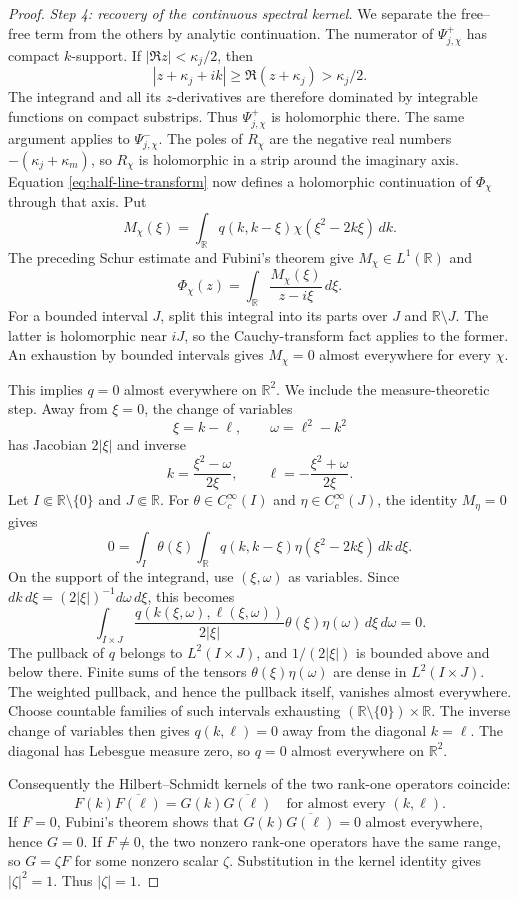 \documentclass[11pt]{amsart}
\numberwithin{equation}{section}
\theoremstyle{remark}
\newcommand{\R}{\mathbb R}
\begin{document}
\begin{proof}
\emph{Step 4: recovery of the continuous spectral kernel.}
We separate the free--free term from the others by analytic continuation.  The numerator of $\Psi^+_{j,\chi}$ has compact $k$-support.
If $|\Re z|<\kappa_j/2$, then
\[
 |z+\kappa_j+ik|\ge \Re(z+\kappa_j)>\kappa_j/2.
\]
The integrand and all its $z$-derivatives are therefore dominated by
integrable functions on compact substrips.  Thus $\Psi^+_{j,\chi}$ is
holomorphic there.  The same argument applies to $\Psi^-_{j,\chi}$.
The poles of $R_\chi$ are the negative real numbers
$-(\kappa_j+\kappa_m)$, so $R_\chi$ is holomorphic in a strip around the
imaginary axis.  Equation \eqref{eq:half-line-transform} now defines a
holomorphic continuation of $\Phi_\chi$ through that axis.  Put
\[
 M_\chi(\xi)=\int_\R q(k,k-\xi)
                 \chi(\xi^2-2k\xi)\,dk.
\]
The preceding Schur estimate and Fubini's theorem give $M_\chi\in L^1(\R)$ and
\[
 \Phi_\chi(z)=\int_\R\frac{M_\chi(\xi)}{z-i\xi}\,d\xi.
\]
For a bounded interval $J$, split this integral into its parts over $J$ and
$\R\setminus J$.  The latter is holomorphic near $iJ$, so the
Cauchy-transform fact applies to the former.  An exhaustion by bounded
intervals gives $M_\chi=0$ almost everywhere for every $\chi$.

This implies $q=0$ almost everywhere on $\R^2$.  We include the measure-theoretic
step.  Away from $\xi=0$, the change of variables
\[
 \xi=k-\ell,
 \qquad \omega=\ell^2-k^2
\]
has Jacobian $2|\xi|$ and inverse
\[
 k=\frac{\xi^2-\omega}{2\xi},
 \qquad
 \ell=-\frac{\xi^2+\omega}{2\xi}.
\]
Let $I\Subset\R\setminus\{0\}$ and $J\Subset\R$.  For
$\theta\in C_c^\infty(I)$ and $\eta\in C_c^\infty(J)$, the identity
$M_\eta=0$ gives
\[
 0=\int_I\theta(\xi)\int_\R q(k,k-\xi)
 \eta(\xi^2-2k\xi)\,dk\,d\xi.
\]
On the support of the integrand, use $(\xi,\omega)$ as variables.  Since
$dk\,d\xi=(2|\xi|)^{-1}d\omega\,d\xi$, this becomes
\[
 \int_{I\times J}
 \frac{q(k(\xi,\omega),\ell(\xi,\omega))}{2|\xi|}
 \theta(\xi)\eta(\omega)\,d\xi\,d\omega=0.
\]
The pullback of $q$ belongs to $L^2(I\times J)$, and $1/(2|\xi|)$ is bounded
above and below there.  Finite sums of the tensors
$\theta(\xi)\eta(\omega)$ are dense in $L^2(I\times J)$.  The weighted
pullback, and hence the pullback itself, vanishes almost everywhere.  Choose
countable families of such intervals exhausting
$(\R\setminus\{0\})\times\R$.  The inverse change of variables then gives
$q(k,\ell)=0$ away from the diagonal $k=\ell$.  The diagonal has
Lebesgue measure zero, so $q=0$ almost everywhere on $\R^2$.

Consequently the Hilbert--Schmidt kernels of the two rank-one operators
coincide:
\[
 F(k)\overline{F(\ell)}=G(k)\overline{G(\ell)}
 \quad\text{for almost every }(k,\ell).
\]
If $F=0$, Fubini's theorem shows that $G(k)\overline{G(\ell)}=0$ almost
everywhere, hence $G=0$.  If $F\ne0$, the two nonzero rank-one operators have
the same range, so $G=\zeta F$ for some nonzero scalar $\zeta$.  Substitution
in the kernel identity gives $|\zeta|^2=1$.  Thus $|\zeta|=1$.


\end{proof}
\end{document}
